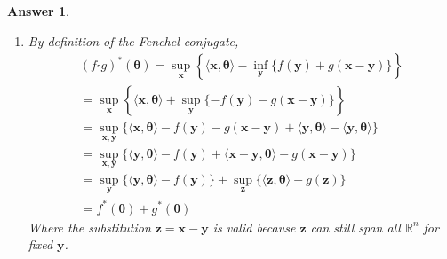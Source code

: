 \documentclass[12pt]{article}
\theoremstyle{colon}
\newtheorem*{answer}{Answer}
\begin{document}
\begin{answer}
	\
	\begin{enumerate}[label=\alph*)]
		\item By definition of the Fenchel conjugate,
			\begin{gather*}
				(f \square g)^*(\bm{\theta}) = \sup_{\bm{x}} \left\{ \langle \bm{x}, \bm{\theta} \rangle - \inf_{\bm{y}} \{ f(\bm{y}) + g(\bm{x}-\bm{y}) \} \right\} \\
				= \sup_{\bm{x}} \left\{ \langle \bm{x}, \bm{\theta} \rangle + \sup_{\bm{y}} \{ - f(\bm{y}) - g(\bm{x}-\bm{y}) \} \right\} \\
				= \sup_{\bm{x}, \bm{y}} \{ \langle \bm{x}, \bm{\theta} \rangle - f(\bm{y}) - g(\bm{x}-\bm{y}) + \langle \bm{y}, \bm{\theta} \rangle - \langle \bm{y}, \bm{\theta} \rangle \} \\
				= \sup_{\bm{x}, \bm{y}} \{ \langle \bm{y}, \bm{\theta} \rangle - f(\bm{y}) + \langle \bm{x} - \bm{y}, \bm{\theta} \rangle - g(\bm{x}-\bm{y}) \} \\
				= \sup_{\bm{y}} \{ \langle \bm{y}, \bm{\theta} \rangle - f(\bm{y}) \} + \sup_{\bm{z}} \{ \langle \bm{z}, \bm{\theta} \rangle - g(\bm{z}) \} \\
				= f^*(\bm{\theta}) + g^*(\bm{\theta})
			\end{gather*}
			Where the substitution $\bm{z} = \bm{x} - \bm{y}$ is valid because $\bm{z}$ can still span all $\mathbb{R}^n$ for fixed $\bm{y}$.


\end{enumerate}
\end{answer}
\end{document}
